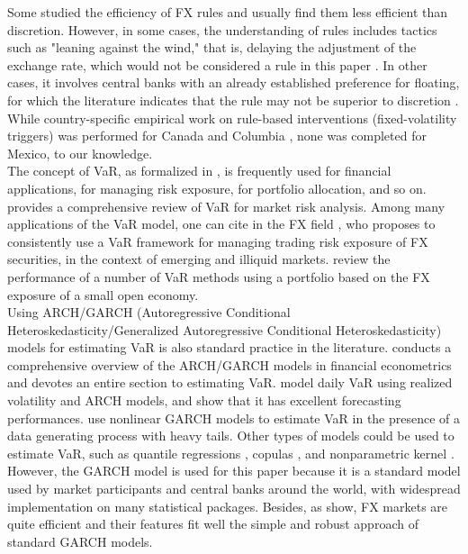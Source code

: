 \documentclass[11pt]{article}
\begin{document}
Some studied the  efficiency of FX rules and usually  find them less efficient
than discretion. However,  in some cases, the understanding  of rules includes
tactics such as  "leaning against the wind," that is,  delaying the adjustment
of the  exchange rate,  which would  not be  considered a  rule in  this paper
\citep{chutasripanich2015}. In other cases, it  involves central banks with an
already  established  preference  for   floating,  for  which  the  literature
indicates that the  rule may not be superior  to discretion \citep{fatum2005}.
While   country-specific   empirical    work   on   rule-based   interventions
(fixed-volatility  triggers) was  performed for  Canada \citep{fatum2005}  and
Columbia  \citep{kuersteiner2018},  none  was  completed for  Mexico,  to  our
knowledge.\\

The concept of VaR, as formalized in \cite{jorion2007}, is frequently used for
financial applications, for managing  risk exposure, for portfolio allocation,
and so  on. \cite{alexander2009}  provides a comprehensive  review of  VaR for
market risk analysis.  Among many applications  of the VaR model, one can cite
in the  FX field \cite{aljanabi2006}, who  proposes to consistently use  a VaR
framework for managing trading risk exposure  of FX securities, in the context
of emerging and illiquid markets.  \cite{bredin2004} review the performance of
a number of VaR methods using a portfolio  based on the FX exposure of a small
open economy.\\

Using  ARCH/GARCH  (Autoregressive Conditional  Heteroskedasticity/Generalized
Autoregressive Conditional  Heteroskedasticity) models  for estimating  VaR is
also  standard  practice  in  the  literature.   \cite{engle2001}  conducts  a
comprehensive overview of the ARCH/GARCH  models in financial econometrics and
devotes an entire section to  estimating VaR.  \cite{giot2004} model daily VaR
using realized  volatility and  ARCH models,  and show  that it  has excellent
forecasting  performances.   \cite{chan2007}  use nonlinear  GARCH  models  to
estimate  VaR  in  the  presence  of a  data  generating  process  with  heavy
tails. Other types of  models could be used to estimate  VaR, such as quantile
regressions    \citep{gaglianone2011},    copulas   \citep{patton2001},    and
nonparametric  kernel \citep{hoogerheide2010}.   However, the  GARCH model  is
used for this paper because it is a standard model used by market participants
and central  banks around  the world, with  widespread implementation  on many
statistical packages.  Besides, as \cite{jeon2002}  show, FX markets are quite
efficient  and their  features  fit well  the simple  and  robust approach  of
standard GARCH models.\\
\end{document}
